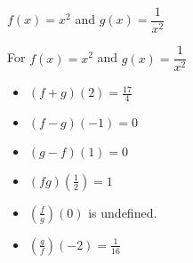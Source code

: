 {$f(x) = x^2$ and  $g(x) = \dfrac{1}{x^2}$}
{For  $f(x) = x^2$ and $g(x) = \dfrac{1}{x^2}$

\begin{multicols}{2}
\begin{itemize}
\item  $(f+g)(2) =\frac{17}{4}$
\item  $(f-g)(-1) = 0$
\item  $(g-f)(1) = 0$
\item  $(fg)\left(\frac{1}{2}\right) =1$
\item  $\left(\frac{f}{g}\right)(0)$ is undefined.
\item  $\left(\frac{g}{f}\right)\left(-2\right) = \frac{1}{16}$
\end{itemize}
\end{multicols}
}